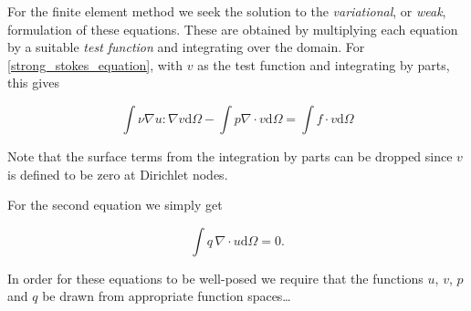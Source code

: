 \documentclass[thesis]{subfiles}
\begin{document}
For the finite element method we seek the solution to the \textit{variational}, or \textit{weak}, formulation of these equations.
These are obtained by multiplying each equation by a suitable \textit{test function} and integrating over the domain.
For \ref{strong_stokes_equation}, with $v$ as the test function and integrating by parts, this gives

\begin{equation}
  \int \nu \nabla u : \nabla v \textrm{d}\Omega
  - \int p \nabla \cdot v \textrm{d}\Omega
  = \int f \cdot v \textrm{d}\Omega
\end{equation}

Note that the surface terms from the integration by parts can be dropped since $v$ is defined to be zero at Dirichlet nodes.

For the second equation we simply get

\begin{equation}
  \int q \, \nabla \cdot u \textrm{d}\Omega = 0.
\end{equation}

In order for these equations to be well-posed we require that the functions $u$, $v$, $p$ and $q$ be drawn from appropriate function spaces\dots




\end{document}
